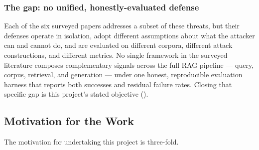 \subsubsection*{The gap: no unified, honestly-evaluated defense}

Each of the six surveyed papers addresses a subset of these threats, but
their defenses operate in isolation, adopt different assumptions about
what the attacker can and cannot do, and are evaluated on different
corpora, different attack constructions, and different metrics. No single
framework in the surveyed literature composes complementary signals
across the full RAG pipeline --- query, corpus, retrieval, and generation
--- under one honest, reproducible evaluation harness that reports both
successes and residual failure rates. Closing that specific gap is this
project's stated objective ().

\subsection{Motivation for the Work}
\label{sec:motivation}

The motivation for undertaking this project is three-fold.

